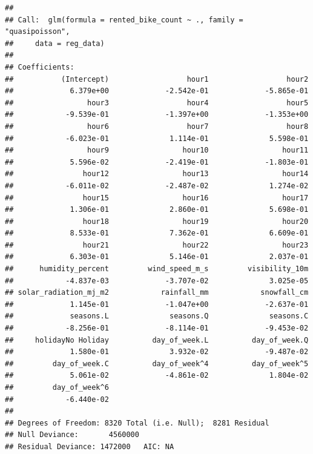 \documentclass[
  11pt,
  letterpaper,
]{article}
\begin{document}
\begin{verbatim}
## 
## Call:  glm(formula = rented_bike_count ~ ., family = "quasipoisson", 
##     data = reg_data)
## 
## Coefficients:
##           (Intercept)                  hour1                  hour2  
##             6.379e+00             -2.542e-01             -5.865e-01  
##                 hour3                  hour4                  hour5  
##            -9.539e-01             -1.397e+00             -1.353e+00  
##                 hour6                  hour7                  hour8  
##            -6.023e-01              1.114e-01              5.598e-01  
##                 hour9                 hour10                 hour11  
##             5.596e-02             -2.419e-01             -1.803e-01  
##                hour12                 hour13                 hour14  
##            -6.011e-02             -2.487e-02              1.274e-02  
##                hour15                 hour16                 hour17  
##             1.306e-01              2.860e-01              5.698e-01  
##                hour18                 hour19                 hour20  
##             8.533e-01              7.362e-01              6.609e-01  
##                hour21                 hour22                 hour23  
##             6.303e-01              5.146e-01              2.037e-01  
##      humidity_percent         wind_speed_m_s         visibility_10m  
##            -4.837e-03             -3.707e-02              3.025e-05  
## solar_radiation_mj_m2            rainfall_mm            snowfall_cm  
##             1.145e-01             -1.047e+00             -2.637e-01  
##             seasons.L              seasons.Q              seasons.C  
##            -8.256e-01             -8.114e-01             -9.453e-02  
##     holidayNo Holiday          day_of_week.L          day_of_week.Q  
##             1.580e-01              3.932e-02             -9.487e-02  
##         day_of_week.C          day_of_week^4          day_of_week^5  
##             5.061e-02             -4.861e-02              1.804e-02  
##         day_of_week^6  
##            -6.440e-02  
## 
## Degrees of Freedom: 8320 Total (i.e. Null);  8281 Residual
## Null Deviance:       4560000 
## Residual Deviance: 1472000   AIC: NA
\end{verbatim}
\end{document}
